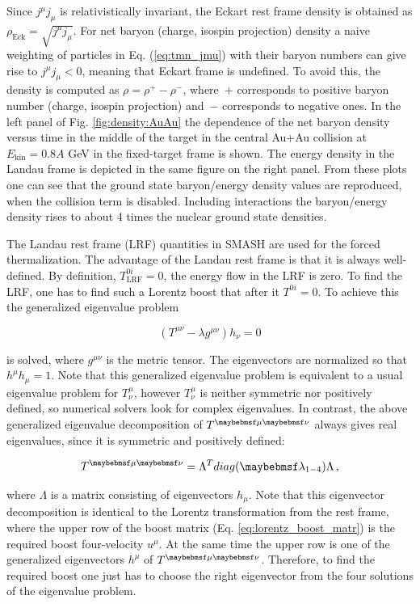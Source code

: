 Since $j^{\mu}j_{\mu}$ is relativistically invariant, the Eckart rest frame density
is obtained as $\rho_\text{Eck} =\sqrt{j^{\mu}j_{\mu}}$. For net baryon
(charge, isospin projection) density a naive weighting of particles in Eq.
(\ref{eq:tmn_jmu}) with their baryon numbers can give rise to $j^{\mu}j_{\mu}
<0$, meaning that Eckart frame is undefined. To avoid this, the density is
computed as $\rho = \rho^+ - \rho^-$, where~$+$ corresponds to positive baryon
number (charge, isospin projection) and~$-$ corresponds to negative ones. In
the left panel of Fig. \ref{fig:density:AuAu} the dependence of the net baryon
density versus time in the middle of the target in the central Au+Au collision
at $E_\text{kin} = 0.8A$ GeV in the fixed-target frame is shown. The energy
density in the Landau frame is depicted in the same figure on the right panel.
From these plots one can see that the ground state baryon/energy density values
are reproduced, when the collision term is disabled. Including interactions the
baryon/energy density rises to about 4 times the nuclear ground state
densities.

The Landau rest frame (LRF) quantities in SMASH are used for the forced
thermalization. The advantage of the Landau rest frame is that it is always
well-defined. By definition, $T^{0i}_\text{LRF} = 0$, the energy flow in the
LRF is zero. To find the LRF, one has to find such a Lorentz boost that after it
$T^{0i} = 0$. To achieve this the generalized eigenvalue problem

\begin{equation}
  (T^{\mu \nu} -\lambda g^{\mu \nu})h_{\nu} = 0
\end{equation}

is solved, where $g^{\mu \nu}$ is the metric tensor. The eigenvectors are
normalized so that $h^{\mu}h_{\mu} = 1$. Note that this generalized eigenvalue
problem is equivalent to a usual eigenvalue problem for $T^{\mu}_{\nu}$,
however $T^{\mu}_{\nu}$ is neither symmetric nor positively defined, so
numerical solvers look for complex eigenvalues. In contrast, the above
generalized eigenvalue decomposition of $\Tmn$ always gives real eigenvalues,
since it is symmetric and positively defined:

\begin{equation}
\Tmn = \Lambda^T diag(\lambda_{1-4}) \Lambda \,,
\end{equation}

where $\Lambda$ is a matrix consisting of eigenvectors $h_{\mu}$. Note that
this eigenvector decomposition is identical to the Lorentz transformation from
the rest frame, where the upper row of the boost matrix (Eq.
\ref{eq:lorentz_boost_matr}) is the required boost four-velocity $u^{\mu}$.
At the same time the upper row is one of the generalized eigenvectors $h^{\mu}$
of $\Tmn$. Therefore, to find the required boost one just has to choose the
right eigenvector from the four solutions of the eigenvalue problem.


